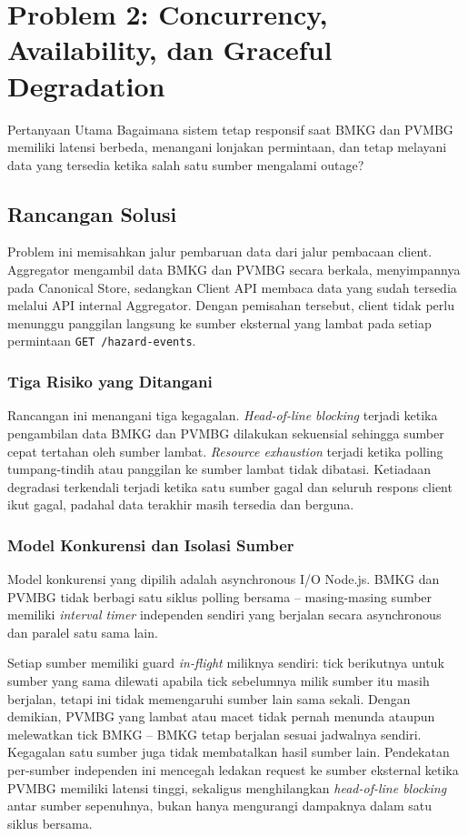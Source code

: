 \section{Problem 2: Concurrency, Availability, dan Graceful Degradation}
\begin{infobox}{Pertanyaan Utama}
Bagaimana sistem tetap responsif saat BMKG dan PVMBG memiliki latensi berbeda,
menangani lonjakan permintaan, dan tetap melayani data yang tersedia ketika
salah satu sumber mengalami outage?
\end{infobox}

\subsection{Rancangan Solusi}
Problem ini memisahkan jalur pembaruan data dari jalur pembacaan client.
Aggregator mengambil data BMKG dan PVMBG secara berkala, menyimpannya pada
Canonical Store, sedangkan Client API membaca data yang sudah tersedia melalui
API internal Aggregator. Dengan pemisahan tersebut, client tidak perlu
menunggu panggilan langsung ke sumber eksternal yang lambat pada setiap
permintaan \texttt{GET /hazard-events}.

\subsubsection{Tiga Risiko yang Ditangani}
Rancangan ini menangani tiga kegagalan. \textit{Head-of-line blocking} terjadi
ketika pengambilan data BMKG dan PVMBG dilakukan sekuensial sehingga sumber
cepat tertahan oleh sumber lambat. \textit{Resource exhaustion} terjadi ketika
polling tumpang-tindih atau panggilan ke sumber lambat tidak dibatasi.
Ketiadaan degradasi terkendali terjadi ketika satu sumber gagal dan seluruh
respons client ikut gagal, padahal data terakhir masih tersedia dan berguna.

\subsubsection{Model Konkurensi dan Isolasi Sumber}
Model konkurensi yang dipilih adalah asynchronous I/O Node.js. BMKG dan PVMBG
tidak berbagi satu siklus polling bersama -- masing-masing sumber memiliki
\textit{interval timer} independen sendiri yang berjalan secara asynchronous dan
paralel satu sama lain.

Setiap sumber memiliki guard \textit{in-flight} miliknya sendiri: tick berikutnya
untuk sumber yang sama dilewati apabila tick sebelumnya milik sumber itu masih
berjalan, tetapi ini tidak memengaruhi sumber lain sama sekali. Dengan demikian,
PVMBG yang lambat atau macet tidak pernah menunda ataupun melewatkan tick BMKG
-- BMKG tetap berjalan sesuai jadwalnya sendiri. Kegagalan satu sumber juga
tidak membatalkan hasil sumber lain. Pendekatan per-sumber independen ini
mencegah ledakan request ke sumber eksternal ketika PVMBG memiliki latensi
tinggi, sekaligus menghilangkan \textit{head-of-line blocking} antar sumber
sepenuhnya, bukan hanya mengurangi dampaknya dalam satu siklus bersama.


